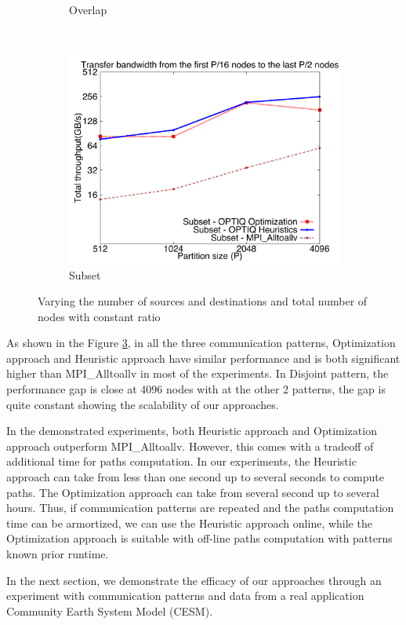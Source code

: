 \begin{figure}[!htbp]
\begin{subfigure}[b]{0.32\textwidth}
                \caption{Overlap}
                \label{fig:constantr_overlap_msg}
        \end{subfigure}
        ~ %
        \begin{subfigure}[b]{0.32\textwidth}
                \includegraphics[width=\textwidth]{figures/constantr_subset_msg.pdf}
                \caption{Subset}
                \label{fig:constantr_subset_msg}
        \end{subfigure}
        \caption{Varying the number of sources and destinations and total number of nodes with constant ratio}
        \label{fig:constantr_msg}
\end{figure}

As shown in the Figure \ref{fig:constantr_msg}, in all the three communication patterns, Optimization approach and Heuristic approach have similar performance and is both significant higher than MPI\_Alltoallv in most of the experiments. In Disjoint pattern, the performance gap is close at 4096 nodes with at the other 2 patterns, the gap is quite constant showing the scalability of our approaches.

In the demonstrated experiments, both Heuristic approach and Optimization approach outperform MPI\_Alltoallv. However, this comes with a tradeoff of additional time for paths computation. In our experiments, the Heuristic approach can take from less than one second up to several seconds to compute paths. The Optimization approach can take from several second up to several hours. Thus, if communication patterns are repeated and the paths computation time can be armortized, we can use the Heuristic approach online, while the Optimization approach is suitable with off-line paths computation with patterns known prior runtime.

In the next section, we demonstrate the efficacy of our approaches through an experiment with communication patterns and data from a real application Community Earth System Model (CESM).
